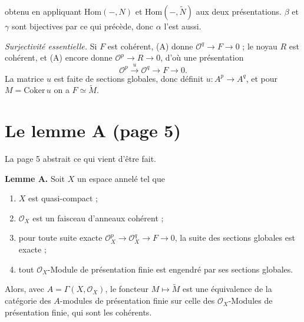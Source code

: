 \documentclass[11pt,a4paper]{article}
\begin{document}

obtenu en appliquant $\mathrm{Hom}(-, N)$ et $\mathrm{Hom}(-, \widetilde{N})$
aux deux présentations. $\beta$ et $\gamma$ sont bijectives par ce qui
précède, donc $\alpha$ l'est aussi.

\emph{Surjectivité essentielle.} Si $F$ est cohérent, (A) donne
$\mathcal{O}^{q} \to F \to 0$ ; le noyau $R$ est cohérent, et (A) encore donne
$\mathcal{O}^{p} \to R \to 0$, d'où une présentation
\[
  \mathcal{O}^{p} \xrightarrow{u} \mathcal{O}^{q} \to F \to 0 .
\]
La matrice $u$ est faite de sections globales, donc définit
$u : A^{p} \to A^{q}$, et pour $M = \mathrm{Coker}\, u$ on a
$F \simeq \widetilde{M}$.

\section*{Le lemme A (page 5)}

La page 5 abstrait ce qui vient d'être fait.

\textbf{Lemme A.} Soit $X$ un espace annelé tel que
\begin{enumerate}
\item[(i)] $X$ est quasi-compact ;
\item[(ii)] $\mathcal{O}_{X}$ est un faisceau d'anneaux cohérent ;
\item[($\alpha$)] pour toute suite exacte $\mathcal{O}_{X}^{p} \to
\mathcal{O}_{X}^{q} \to F \to 0$, la suite des sections globales est exacte ;
\item[($\beta$)] tout $\mathcal{O}_{X}$-Module de présentation finie est
engendré par ses sections globales.
\end{enumerate}
Alors, avec $A = \Gamma(X, \mathcal{O}_{X})$, le foncteur
$M \mapsto \widetilde{M}$ est une équivalence de la catégorie des $A$-modules
de présentation finie sur celle des $\mathcal{O}_{X}$-Modules de présentation
finie, qui sont les cohérents.
\end{document}
